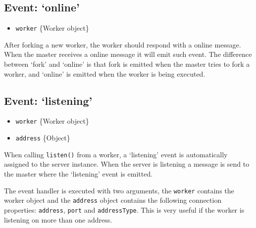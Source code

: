 \subsection{Event: `online'}

\begin{itemize}
\item
  \texttt{worker} \{Worker object\}
\end{itemize}

After forking a new worker, the worker should respond with a online
message. When the master receives a online message it will emit such
event. The difference between `fork' and `online' is that fork is
emitted when the master tries to fork a worker, and `online' is emitted
when the worker is being executed.

\begin{Shaded}
\begin{Highlighting}[]
\NormalTok{(}\NormalTok{, }
  \NormalTok{(}\NormalTok{);}
\NormalTok{\});}
\end{Highlighting}
\end{Shaded}

\subsection{Event: `listening'}

\begin{itemize}
\item
  \texttt{worker} \{Worker object\}
\item
  \texttt{address} \{Object\}
\end{itemize}

When calling \texttt{listen()} from a worker, a `listening' event is
automatically assigned to the server instance. When the server is
listening a message is send to the master where the `listening' event is
emitted.

The event handler is executed with two arguments, the \texttt{worker}
contains the worker object and the \texttt{address} object contains the
following connection properties: \texttt{address}, \texttt{port} and
\texttt{addressType}. This is very useful if the worker is listening on
more than one address.

\begin{Shaded}
\begin{Highlighting}[]
\NormalTok{(}\NormalTok{, }
  \NormalTok{(} \NormalTok{+ } \NormalTok{+ } \NormalTok{+ }\NormalTok{);}
\NormalTok{\});}
\end{Highlighting}
\end{Shaded}


